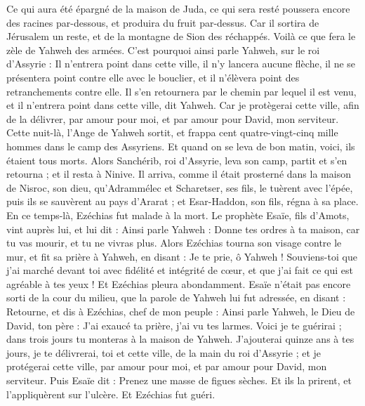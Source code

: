 \begin{multicols}{2}
Ce qui aura été épargné de la maison de Juda, ce qui sera resté poussera encore des racines par-dessous, et produira du fruit par-dessus.
Car il sortira de Jérusalem un reste, et de la montagne de Sion des réchappés. Voilà ce que fera le zèle de Yahweh des armées.
C’est pourquoi ainsi parle Yahweh, sur le roi d’Assyrie : Il n’entrera point dans cette ville, il n’y lancera aucune flèche, il ne se présentera point contre elle avec le bouclier, et il n’élèvera point des retranchements contre elle.
Il s’en retournera par le chemin par lequel il est venu, et il n’entrera point dans cette ville, dit Yahweh.
Car je protègerai cette ville, afin de la délivrer, par amour pour moi, et par amour pour David, mon serviteur.
Cette nuit-là, l’Ange de Yahweh sortit, et frappa cent quatre-vingt-cinq mille hommes dans le camp des Assyriens. Et quand on se leva de bon matin, voici, ils étaient tous morts.
Alors Sanchérib, roi d’Assyrie, leva son camp, partit et s’en retourna ; et il resta à Ninive.
Il arriva, comme il était prosterné dans la maison de Nisroc, son dieu, qu’Adrammélec et Scharetser, ses fils, le tuèrent avec l’épée, puis ils se sauvèrent au pays d’Ararat ; et Esar-Haddon, son fils, régna à sa place.
\VerseOne{}En ce temps-là, Ezéchias fut malade à la mort. Le prophète Esaïe, fils d’Amots, vint auprès lui, et lui dit : Ainsi parle Yahweh : Donne tes ordres à ta maison, car tu vas mourir, et tu ne vivras plus.
Alors Ezéchias tourna son visage contre le mur, et fit sa prière à Yahweh, en disant :
Je te prie, ô Yahweh ! Souviens-toi que j’ai marché devant toi avec fidélité et intégrité de cœur, et que j’ai fait ce qui est agréable à tes yeux ! Et Ezéchias pleura abondamment.
Esaïe n’était pas encore sorti de la cour du milieu, que la parole de Yahweh lui fut adressée, en disant :
Retourne, et dis à Ezéchias, chef de mon peuple : Ainsi parle Yahweh, le Dieu de David, ton père : J’ai exaucé ta prière, j’ai vu tes larmes. Voici je te guérirai ; dans trois jours tu monteras à la maison de Yahweh.
J’ajouterai quinze ans à tes jours, je te délivrerai, toi et cette ville, de la main du roi d’Assyrie ; et je protégerai cette ville, par amour pour moi, et par amour pour David, mon serviteur.
Puis Esaïe dit : Prenez une masse de figues sèches. Et ils la prirent, et l’appliquèrent sur l’ulcère. Et Ezéchias fut guéri.

\end{multicols}
